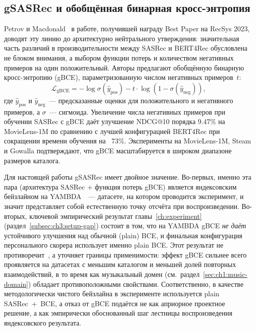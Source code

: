 \subsection{gSASRec и обобщённая бинарная кросс-энтропия}
\label{subsec:ch1:gsasrec}

Petrov и Macdonald~\cite{gsasrec2023} в работе, получившей награду Best Paper на RecSys 2023, доводят эту линию до архитектурно нейтрального утверждения: значительная часть различий в производительности между SASRec и BERT4Rec обусловлена не блоком внимания, а выбором функции потерь и количеством негативных примеров на один положительный. Авторы предлагают обобщённую бинарную кросс-энтропию (gBCE), параметризованную числом негативных примеров~$t$:
\begin{equation*}
    \mathcal{L}_{\mathrm{gBCE}} = -\log \sigma(\hat{y}_{\mathrm{pos}}) - t \cdot \log\!\left(1 - \sigma(\hat{y}_{\mathrm{neg}})\right),
\end{equation*}
где $\hat{y}_{\mathrm{pos}}$ и $\hat{y}_{\mathrm{neg}}$~--- предсказанные оценки для положительного и негативного примеров, а $\sigma$~--- сигмоида. Увеличение числа негативных примеров при обучении SASRec с gBCE даёт улучшение NDCG@10 порядка 9.47\% на MovieLens-1M по сравнению с лучшей конфигурацией BERT4Rec при сокращении времени обучения на ~73\%. Эксперименты на MovieLens-1M, Steam и Gowalla подтверждают, что gBCE масштабируется в широком диапазоне размеров каталога.

Для настоящей работы gSASRec имеет двойное значение. Во-первых, именно эта пара (архитектура SASRec + функция потерь gBCE) является яндексовским бейзлайном на YAMBDA~\cite{yambda2025}~--- датасете, на котором проводится эксперимент, и значит представляет собой естественную точку отсчёта при воспроизведении. Во-вторых, ключевой эмпирический результат главы~\ref{ch:experiment} (раздел~\ref{subsec:ch3:setup-gap}) состоит в том, что на YAMBDA gBCE \emph{не даёт} устойчивого улучшения над обычной (plain) BCE, и финальная конфигурация персонального скорера использует именно plain BCE. Этот результат не противоречит~\cite{gsasrec2023}, а уточняет границы применимости: эффект gBCE сильнее всего проявляется на датасетах с меньшим каталогом и меньшей долей повторных взаимодействий, в то время как музыкальный домен (см.~раздел~\ref{sec:ch1:music-domain}) обладает противоположными свойствами. Соответственно, в качестве методологически чистого бейзлайна в эксперименте используется plain SASRec~+~BCE, а отказ от gBCE подаётся не как априорное проектное решение, а как эмпирически обоснованный шаг лестницы воспроизведения яндексовского результата.

